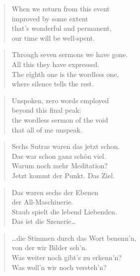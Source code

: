 \documentclass[10pt,a4paper]{article}
\begin{document}
\begin{paracol}{2}
\begin{verse}
When we return from this event\\
improved by some extent\\
that’s wonderful and permanent,\\
our time will be well-spent.
\end{verse}

\begin{verse}
Through seven sermons we have gone.\\
All this they have expressed.\\
The eighth one is the wordless one,\\
where silence tells the rest.
\end{verse}

\begin{verse}
Unspoken, zero words employed\\
beyond this final peak:\\
the wordless sermon of the void\\
that all of me unspeak.
\end{verse}

\switchcolumn


\begin{verse}
Sechs Sutras waren das jetzt schon. \\
Das war schon ganz schön viel. \\
Warum noch mehr Meditation? \\
Jetzt kommt der Punkt. Das Ziel. \\
\end{verse}

\begin{verse}
Das waren sechs der Ebenen \\
der All-Maschinerie. \\
Staub spielt die lebend Liebenden. \\
Das ist die Szenerie… \\
\end{verse}

\begin{verse}
…die Stimmen durch das Wort benenn’n, \\
von der wir Bilder seh’n. \\
Was weiter noch gibt’s zu erkenn’n? \\
Was woll’n wir noch versteh’n? \\
\end{verse}


\end{paracol}
\end{document}
